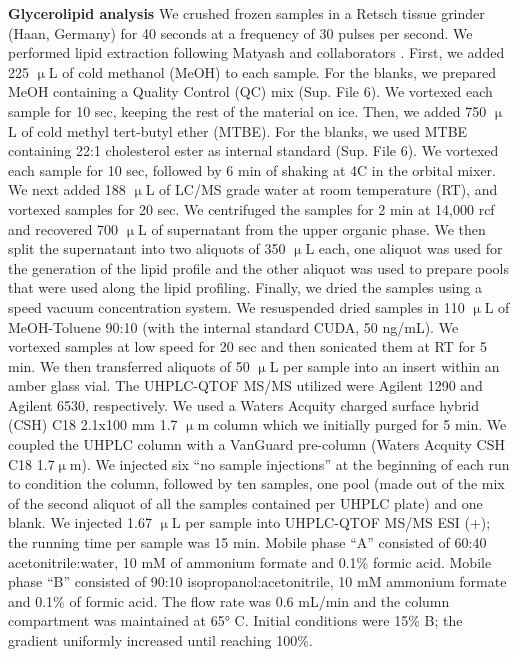 \documentclass[9pt,twocolumn,twoside,lineno]{biorxiv}
\begin{document}
\textbf{Glycerolipid analysis} 
We crushed frozen samples in a Retsch tissue grinder (Haan, Germany) for 40 seconds at a frequency of 30 pulses per second. 
We performed lipid extraction following Matyash and collaborators \cite{Matyash2008-ue}. 
First, we added 225 $\upmu$L of cold methanol (MeOH) to each sample. 
For the blanks, we prepared MeOH containing a Quality Control (QC) mix (Sup. File 6).
We vortexed each sample for 10 sec, keeping the rest of the material on ice. 
Then, we added 750 $\upmu$L of cold methyl tert-butyl ether (MTBE). 
For the blanks, we used MTBE containing 22:1 cholesterol ester as internal standard (Sup. File 6). 
We vortexed each sample for 10 sec, followed by 6 min of shaking at 4\degree C in the orbital mixer. 
We next added 188 $\upmu$L of LC/MS grade water at room temperature (RT), and vortexed samples for 20 sec.
We centrifuged the samples for 2 min at 14,000 rcf and recovered 700 $\upmu$L of supernatant from the upper organic phase. 
We then split the supernatant into two aliquots of 350 $\upmu$L each, one aliquot was used for the generation of the lipid profile and the other aliquot was used to prepare pools that were used along the lipid profiling. 
Finally, we dried the samples using a speed vacuum concentration system.
We resuspended dried samples in 110 $\upmu$L of MeOH-Toluene 90:10 (with the internal standard CUDA, 50 ng/mL). 
We vortexed samples at low speed for 20 sec and then sonicated them at RT for 5 min. 
We then transferred aliquots of 50 $\upmu$L per sample into an insert within an amber glass vial.
The UHPLC-QTOF MS/MS utilized were Agilent 1290 and Agilent 6530, respectively. 
We used a Waters Acquity charged surface hybrid (CSH) C18 2.1x100 mm 1.7 $\upmu$m column which we initially purged for 5 min. 
We coupled the UHPLC column with a VanGuard pre-column (Waters Acquity CSH C18 1.7$\upmu$m). 
We injected six “no sample injections” at the beginning of each run to condition the column, followed by ten samples, one pool (made out of the mix of the second aliquot of all the samples contained per UHPLC plate) and one blank.
We injected 1.67 $\upmu$L per sample into UHPLC-QTOF MS/MS ESI (+); the running time per sample was 15 min. 
Mobile phase “A” consisted of 60:40 acetonitrile:water, 10 mM of ammonium formate and 0.1\% formic acid. 
Mobile phase “B” consisted of 90:10 isopropanol:acetonitrile, 10 mM ammonium formate and 0.1\% of formic acid. 
The flow rate was 0.6 mL/min and the column compartment was maintained at 65° C. Initial conditions were 15\% B; the gradient uniformly increased until reaching 100\%. 
\end{document}
